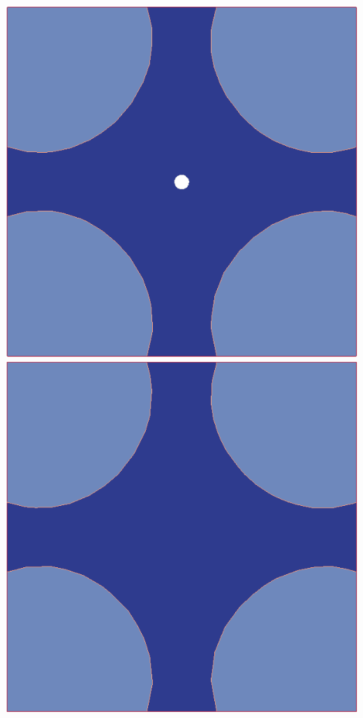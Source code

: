 \documentclass[11pt]{beamer} %
\begin{document}
\begin{frame}
\begin{center}
  \includegraphics[scale=0.10]{figures/evolve_free_c}\quad
  \includegraphics[scale=0.10]{figures/evolve_free_d}
 \end{center}
 \begin{itemize}

\end{itemize}
\end{frame}
\end{document}
